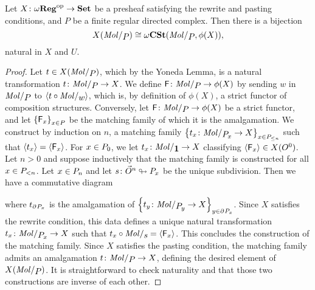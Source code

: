 \begin{lem} \label{lem:stricter_hom_set_iso_presheaf}
    Let \( X \colon \opp{\omegaReg} \to \Set \) be a presheaf satisfying the rewrite and pasting conditions, and \( P \) be a finite regular directed complex.
    Then there is a bijection
    \begin{equation*}
        X(\molecin{P}) \cong \Comp(\molecin{P}, \phi(X)),
    \end{equation*}
    natural in \( X \) and \( U \).
\end{lem}
\begin{proof}
    Let \( t \in X(\molecin{P}) \), which by the Yoneda Lemma, is a natural transformation \( t \colon \molecin{P} \to X \).
    We define \( \F \colon \molecin{P} \to \phi(X) \) by sending \( w \) in \( \molecin{P} \) to \( \pcell{t \after \molecin{w}} \), which is, by definition of \( \phi(X) \), a strict functor of composition structures.
    Conversely, let \( \F \colon \molecin{P} \to \phi(X) \) be a strict functor, and let \( \set{\F_x}_{x \in P} \) be the matching family of which it is the amalgamation.
    We construct by induction on \( n \), a matching family \( \set{t_x \colon \molecin{\imel{P}{x}} \to X}_{x \in \gr{\le n}{P}} \) such that \( \pcell{t_x} = \pcell{\F_x} \).    
    For \( x \in \gr{0}{P} \), we let \( t_x \colon \molecin{\pt} \to X \) classifying \( \pcell{\F_x} \in X(\globe{0}) \).
    Let \( n > 0 \) and suppose inductively that the matching family is constructed for all \( x \in \gr{< n}{P} \).
    Let \( x \in \gr{n}{P} \) and let \( s \colon \dglobe{n} \sd \imel{P}{x} \) be the unique subdivision.
    Then we have a commutative diagram
    \begin{center}
    \end{center}
    where \( t_{\bd{}{} \imel{P}{x}} \) is the amalgamation of \( \set{t_y \colon \molecin{\imel{P}{y}} \to X}_{y \in \bd{}{} \imel{P}{x}} \).
    Since \( X \) satisfies the rewrite condition, this data defines a unique natural transformation \( t_x \colon \molecin{\imel{P}{x}} \to X \) such that \( t_x \after \molecin{s} = \pcell{\F_x} \).
    This concludes the construction of the matching family.
    Since \( X \) satisfies the pasting condition, the matching family admits an amalgamation \( t \colon \molecin{P} \to X \), defining the desired element of \( X(\molecin{P}) \).
    It is straightforward to check naturality and that those two constructions are inverse of each other.
\end{proof}

